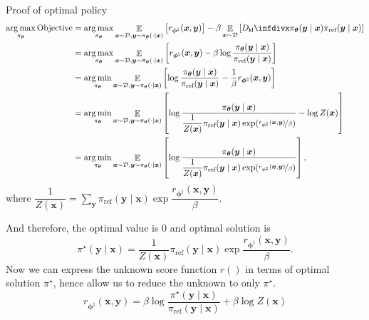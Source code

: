 \documentclass[10pt,xcolor={usenames,dvipsnames,table},aspectratio=169]{beamer}
\begin{document}
\begin{frame}{Proof of optimal policy}
\begin{align*}
\argmax_{\pi_{\boldsymbol \theta}} \text{Objective} 
&= \argmax_{\pi_{\boldsymbol \theta}}\mathop{\mathbb{E}}_{\bm{x} \sim \mathcal{D}, {\bm{y} \sim \pi_{\boldsymbol \theta}(\cdot \mid \bm{x})}} \left[  { r_{\boldsymbol \phi^{\natural}}(\bm{x}, \bm{y})} \right] 
    - \beta \mathop{\mathbb{E}}_{\bm{x} \sim \mathcal{D}} \left[  \Dkl{\pi_{\boldsymbol \theta}(\bm{y} \mid \bm{x})}{\pi_{\text{ref}}(\bm{y} \mid \bm{x})}\right]  \\
&= \argmax_{\pi_{\boldsymbol \theta}} \mathop{\mathbb{E}}_{\bm{x} \sim \mathcal{D}, {\bm{y} \sim \pi_{\boldsymbol \theta}(\cdot \mid \bm{x})}} \left[  { r_{\boldsymbol \phi^{\natural}}(\bm{x}, \bm{y})}  - \beta \log \dfrac{\pi_{\boldsymbol \theta}(\bm{y} \mid \bm{x})}{\pi_{\text{ref}}(\bm{y} \mid \bm{x})} \right] \\
&= \argmin_{\pi_{\boldsymbol \theta}} \mathop{\mathbb{E}}_{\bm{x} \sim \mathcal{D}, {\bm{y} \sim \pi_{\boldsymbol \theta}(\cdot \mid \bm{x})}} \left[ \log \dfrac{\pi_{\boldsymbol \theta}(\bm{y} \mid \bm{x})}{\pi_{\text{ref}}(\bm{y} \mid \bm{x})} -  \dfrac{1}{\beta} r_{\boldsymbol \phi^{\natural}}(\bm{x}, \bm{y})   \right] \\
&= \argmin_{\pi_{\boldsymbol \theta}} \mathop{\mathbb{E}}_{\bm{x} \sim \mathcal{D}, {\bm{y} \sim \pi_{\boldsymbol \theta}(\cdot \mid \bm{x})}} \left[ \log \dfrac{\pi_{\boldsymbol \theta}(\bm{y} \mid \bm{x})}{\dfrac{1}{Z(\bm{x})}\pi_{\text{ref}}(\bm{y} \mid \bm{x}) \exp(\nicefrac{r_{\boldsymbol \phi^{\natural}}(\bm{x}, \bm{y})}{\beta} )} - \log Z(\bm{x}) \right] \\
&= \argmin_{\pi_{\boldsymbol \theta}} \mathop{\mathbb{E}}_{\bm{x} \sim \mathcal{D}, {\bm{y} \sim \pi_{\boldsymbol \theta}(\cdot \mid \bm{x})}} \left[ \log \dfrac{\pi_{\boldsymbol \theta}(\bm{y} \mid \bm{x})}{\dfrac{1}{Z(\bm{x})}\pi_{\text{ref}}(\bm{y} \mid \bm{x}) \exp(\nicefrac{r_{\boldsymbol \phi^{\natural}}(\bm{x}, \bm{y})}{\beta} )}\right],
\end{align*}
where $\dfrac{1}{Z(\bm{x})} = \sum_{\bm{y}} \pi_{\text{ref}}(\bm{y} \mid \bm{x}) \exp \dfrac{r_{\boldsymbol \phi^{\natural}}(\bm{x}, \bm{y})}{\beta}$.
\end{frame}
\begin{frame}
    And therefore, the optimal value is $0$ and optimal solution is
    \[
    \pi^{\star }(\bm{y} \mid \bm{x}) = \dfrac{1}{Z(\bm{x})} \pi_{\text{ref}}(\bm{y} \mid \bm{x}) \exp \dfrac{r_{\boldsymbol \phi^{\natural}}(\bm{x}, \bm{y})}{\beta}.
    \] 
Now we can express the unknown score function $r()$ in terms of optimal solution $\pi^{\star }$, hence allow us to reduce the unknown to only $\pi^{\star }$.
\[
r_{\boldsymbol \phi^{\natural}}(\bm{x}, \bm{y}) = \beta \log \dfrac{\pi^{\star }(\bm{y} \mid \bm{x})}{\pi_{\text{ref}}(\bm{y} \mid \bm{x})} + \beta \log Z(\bm{x})
\] 
\end{frame}
\end{document}

